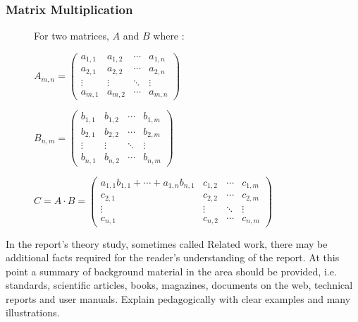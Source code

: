 \subsubsection{Matrix Multiplication}

\begin{figure}[H]
	\begin{center}
		For two matrices, $A$ and $B$ where :

		\vspace{1cm}

$A_{m,n} = 
\begin{pmatrix}
a_{1,1} & a_{1,2} & \cdots & a_{1,n} \\
a_{2,1} & a_{2,2} & \cdots & a_{2,n} \\
\vdots  & \vdots  & \ddots & \vdots  \\
a_{m,1} & a_{m,2} & \cdots & a_{m,n} 
\end{pmatrix}$

		\vspace{1cm}

$B_{n,m} = 
\begin{pmatrix}
b_{1,1} & b_{1,2} & \cdots & b_{1,m} \\
b_{2,1} & b_{2,2} & \cdots & b_{2,m} \\
\vdots  & \vdots  & \ddots & \vdots  \\
b_{n,1} & b_{n,2} & \cdots & b_{n,m} 
\end{pmatrix}$

		\vspace{1cm}

$C = A \cdot B =
\begin{pmatrix}
	a_{1,1}b_{1,1} + \cdots + a_{1,n}b_{n,1} & c_{1,2} & \cdots & c_{1,m} \\
c_{2,1} & c_{2,2} & \cdots & c_{2,m} \\
\vdots  & \vdots  & \ddots & \vdots  \\
c_{n,1} & c_{n,2} & \cdots & c_{n,m} 
\end{pmatrix}$
	\end{center}
\end{figure}

\iffalse
In the report's theory study, sometimes called Related work, there may be additional facts required for the reader's understanding of the report. At this point a summary of background material in the area should be provided, i.e. standards, scientific articles, books, magazines, documents on the web, technical reports and user manuals. Explain pedagogically with clear examples and many illustrations.

